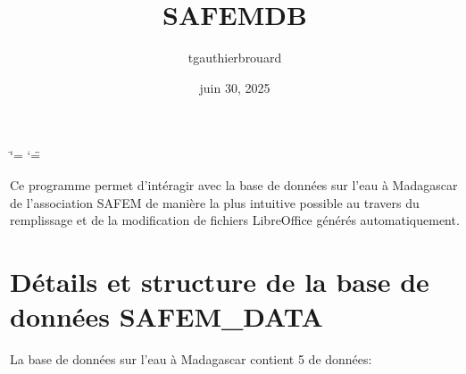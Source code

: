 \documentclass[letterpaper,10pt,french]{sphinxmanual}
\title{SAFE\sphinxhyphen{}M\sphinxhyphen{}DB}
\date{juin 30, 2025}
\author{tgauthierbrouard}
\begin{document}
\ifdefined\shorthandoff
  \ifnum\catcode`\=\string=\active\shorthandoff{=}\fi
  \ifnum\catcode`\"=\active{}\fi
\fi

\pagestyle{empty}
\sphinxmaketitle
\pagestyle{plain}
\sphinxtableofcontents
\pagestyle{normal}
\label{\detokenize{index::doc}}


\sphinxAtStartPar
Ce programme permet d’intéragir avec la base de données sur l’eau à Madagascar de l’association
SAFE\sphinxhyphen{}M de manière la plus intuitive possible au travers du remplissage et de la modification de fichiers
LibreOffice générés automatiquement.

\sphinxstepscope


\chapter{Détails et structure de la base de données SAFEM\_DATA}
\label{\detokenize{bones:details-et-structure-de-la-base-de-donnees-safem-data}}\label{\detokenize{bones:skeleton}}\label{\detokenize{bones::doc}}
\sphinxAtStartPar
La base de données sur l’eau à Madagascar  contient 5  de données:

\begin{sphinxVerbatim}[commandchars=\\\{\}]
 \PYG{p}{[}\PYG{p}{]}  

  
               
               
          
          
               
\end{sphinxVerbatim}
\end{document}
